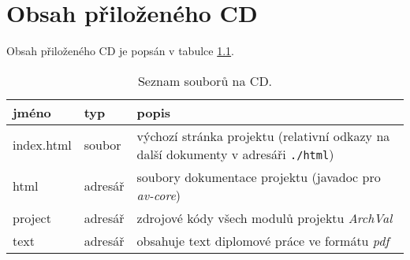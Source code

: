 \chapter{Obsah přiloženého CD}

Obsah přiloženého CD je popsán v tabulce \ref{cd_files_table}.

\begin{table}[ht]
  \centering
  \begin{tabular}{|l|l|p{20em}|}
    \hline
    jméno & typ & popis \\
    \hline
    \hline
    index.html & soubor & výchozí stránka projektu (relativní odkazy na další dokumenty v adresáři \verb+./html+) \\
    \hline
    html & adresář & soubory dokumentace projektu (javadoc pro \emph{av-core}) \\
    \hline
    project & adresář & zdrojové kódy všech modulů projektu \emph{ArchVal} \\
    \hline
    text & adresář & obsahuje text diplomové práce ve formátu \emph{pdf} \\
    \hline
  \end{tabular}
  \caption{Seznam souborů na CD. \label{cd_files_table}}
\end{table}
